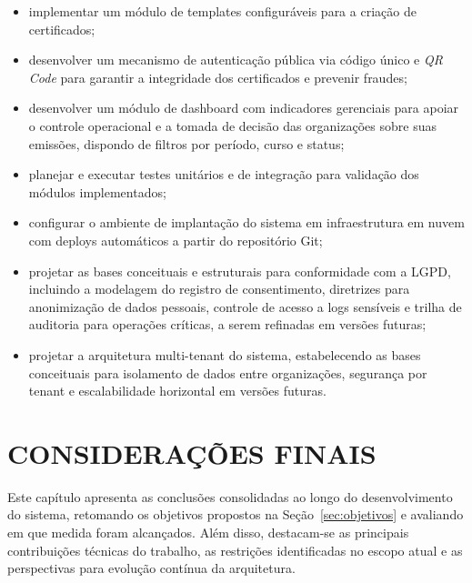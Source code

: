\documentclass[12pt,openright,oneside,a4paper]{article}
\begin{document}
\begin{itemize}
    \item implementar um módulo de templates configuráveis para a criação de certificados;
    \item desenvolver um mecanismo de autenticação pública via código único e \textit{QR Code} para garantir a integridade dos certificados e prevenir fraudes;
    \item desenvolver um módulo de dashboard com indicadores gerenciais para apoiar o controle operacional e a tomada de decisão das organizações sobre suas emissões, dispondo de filtros por período, curso e status;
    \item planejar e executar testes unitários e de integração para validação dos módulos implementados;
    \item configurar o ambiente de implantação do sistema em infraestrutura em nuvem com deploys automáticos a partir do repositório Git;
    \item projetar as bases conceituais e estruturais para conformidade com a LGPD, incluindo a modelagem do registro de consentimento, diretrizes para anonimização de dados pessoais, controle de acesso a logs sensíveis e trilha de auditoria para operações críticas, a serem refinadas em versões futuras;
    \item projetar a arquitetura multi-tenant do sistema, estabelecendo as bases conceituais para isolamento de dados entre organizações, segurança por tenant e escalabilidade horizontal em versões futuras.
\end{itemize}







\section{CONSIDERAÇÕES FINAIS}

Este capítulo apresenta as conclusões consolidadas ao longo do desenvolvimento do sistema, retomando os objetivos propostos na Seção~\ref{sec:objetivos} e avaliando em que medida foram alcançados. Além disso, destacam-se as principais contribuições técnicas do trabalho, as restrições identificadas no escopo atual e as perspectivas para evolução contínua da arquitetura.
\end{document}
